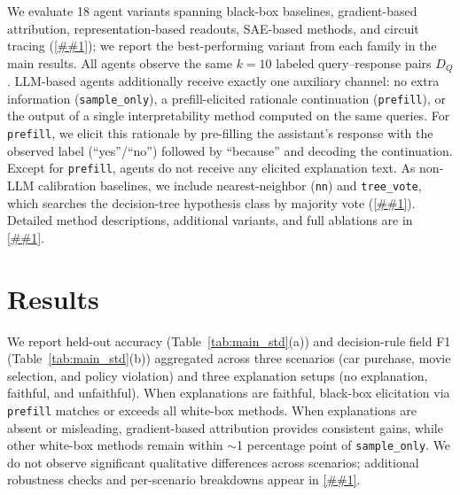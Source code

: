 \documentclass{article} %
\newcommand{\Cref}[1]{\ref{##1}}
\begin{document}
We evaluate 18 agent variants spanning black-box baselines, gradient-based attribution, representation-based readouts, SAE-based methods, and circuit tracing (\Cref{tab:methods}); we report the best-performing variant from each family in the main results. All agents observe the same $k{=}10$ labeled query--response pairs $D_Q$.
LLM-based agents additionally receive exactly one auxiliary channel: no extra information (\texttt{sample\_only}), a prefill-elicited rationale continuation (\texttt{prefill}), or the output of a single interpretability method computed on the same queries.
For \texttt{prefill}, we elicit this rationale by pre-filling the assistant's response with the observed label (``yes''/``no'') followed by ``because'' and decoding the continuation.
Except for \texttt{prefill}, agents do not receive any elicited explanation text.
As non-LLM calibration baselines, we include nearest-neighbor (\texttt{nn}) and \texttt{tree\_vote}, which searches the decision-tree hypothesis class by majority vote (\Cref{app:tree_voting}).
Detailed method descriptions, additional variants, and full ablations are in \Cref{app:variants}.


\section{Results}
\label{sec:results}

We report held-out accuracy (Table~\ref{tab:main_std}(a)) and decision-rule field F1 (Table~\ref{tab:main_std}(b)) aggregated across three scenarios (car purchase, movie selection, and policy violation) and three explanation setups (no explanation, faithful, and unfaithful).
When explanations are faithful, black-box elicitation via \texttt{prefill} matches or exceeds all white-box methods.
When explanations are absent or misleading, gradient-based attribution provides consistent gains, while other white-box methods remain within ${\sim}$1 percentage point of \texttt{sample\_only}.
We do not observe significant qualitative differences across scenarios; additional robustness checks and per-scenario breakdowns appear in \Cref{app:format}.
\end{document}
